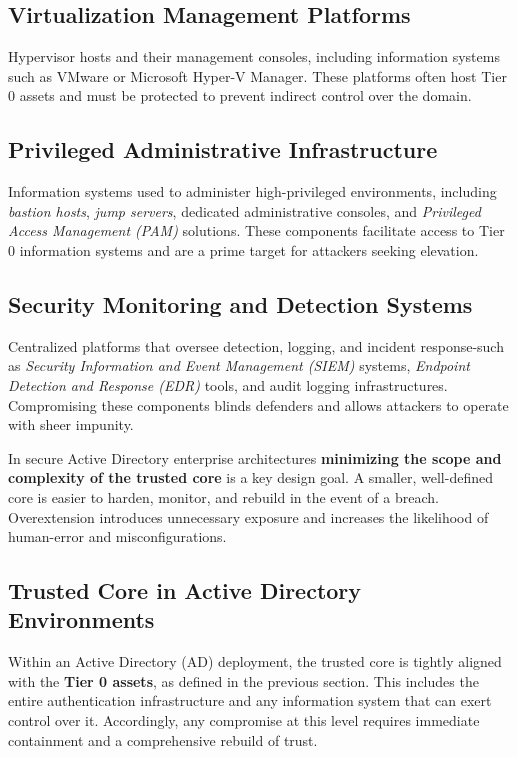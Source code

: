 \begin{itemize}
\subsection{Virtualization Management Platforms}
Hypervisor hosts and their management consoles, including information systems such as VMware or Microsoft Hyper-V Manager. These platforms often host Tier 0 assets and must be protected to prevent indirect control over the domain.

\subsection{Privileged Administrative Infrastructure}
Information systems used to administer high-privileged environments, including \textit{bastion hosts}, \textit{jump servers}, dedicated administrative consoles, and \textit{Privileged Access Management (PAM)} solutions. These components facilitate access to Tier 0 information systems and are a prime target for attackers seeking elevation.

\subsection{Security Monitoring and Detection Systems}
Centralized platforms that oversee detection, logging, and incident response-such as \textit{Security Information and Event Management (SIEM)} systems, \textit{Endpoint Detection and Response (EDR)} tools, and audit logging infrastructures. Compromising these components blinds defenders and allows attackers to operate with sheer impunity.
\end{itemize}

In secure Active Directory enterprise architectures \textbf{minimizing the scope and complexity of the trusted core} is a key design goal. A smaller, well-defined core is easier to harden, monitor, and rebuild in the event of a breach. Overextension introduces unnecessary exposure and increases the likelihood of human-error and misconfigurations.

\subsection{Trusted Core in Active Directory Environments}
Within an Active Directory (AD) deployment, the trusted core is tightly aligned with the \textbf{Tier 0 assets}, as defined in the previous section. This includes the entire authentication infrastructure and any information system that can exert control over it. Accordingly, any compromise at this level requires immediate containment and a comprehensive rebuild of trust.

